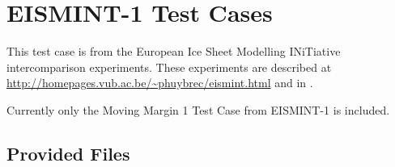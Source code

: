 \FloatBarrier


\section{EISMINT-1 Test Cases}
\label{sec:eismint_description}
This test case is from the European Ice Sheet Modelling INiTiative intercomparison experiments.  These experiments are described at \url{http://homepages.vub.ac.be/~phuybrec/eismint.html} and in \citet{Huybrechts1996}.

Currently only the Moving Margin 1 Test Case from EISMINT-1 is included.


\subsection{Provided Files}
\label{subsec:eismint_files}


